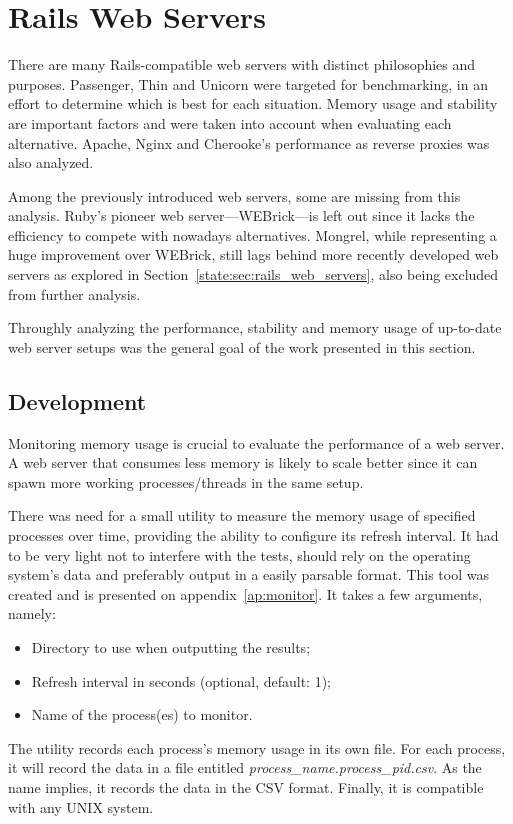 \section{Rails Web Servers} %
\label{solution:sec:rails_web_servers}
There are many Rails-compatible web servers with distinct philosophies and purposes. Passenger, Thin and Unicorn were targeted for benchmarking, in an effort to determine which is best for each situation. Memory usage and stability are important factors and were taken into account when evaluating each alternative. Apache, Nginx and Cherooke's performance as reverse proxies was also analyzed.

Among the previously introduced web servers, some are missing from this analysis. Ruby's pioneer web server---WEBrick---is left out since it lacks the efficiency to compete with nowadays alternatives. Mongrel, while representing a huge improvement over WEBrick, still lags behind more recently developed web servers as explored in Section~\ref{state:sec:rails_web_servers}, also being excluded from further analysis.

Throughly analyzing the performance, stability and memory usage of up-to-date web server setups was the general goal of the work presented in this section.

\subsection{Development}
Monitoring memory usage is crucial to evaluate the performance of a web server. A web server that consumes less memory is likely to scale better since it can spawn more working processes/threads in the same setup.

There was need for a small utility to measure the memory usage of specified processes over time, providing the ability to configure its refresh interval. It had to be very light not to interfere with the tests, should rely on the operating system's data and preferably output in a easily parsable format. This tool was created and is presented on appendix~\ref{ap:monitor}. It takes a few arguments, namely:
\begin{itemize}
  \item Directory to use when outputting the results;
  \item Refresh interval in seconds (optional, default: 1);
  \item Name of the process(es) to monitor.
\end{itemize}
The utility records each process's memory usage in its own file. For each process, it will record the data in a file entitled \textit{process\_name.process\_pid.csv}. As the name implies, it records the data in the CSV format. Finally, it is compatible with any UNIX system.

